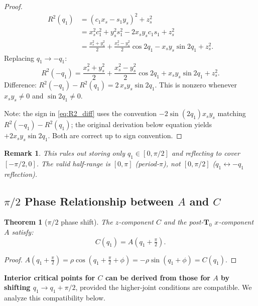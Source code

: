 \documentclass[11pt,a4paper]{article}
\newtheorem{theorem}{Theorem}[section]
\newtheorem{remark}{Remark}[section]
\newcommand{\bT}{\mathbf{T}}
\begin{document}
\begin{proof}
\begin{align*}
  R^2(q_1) &= (c_1 x_s - s_1 y_s)^2 + z_s^2 \\
  &= x_s^2 c_1^2 + y_s^2 s_1^2 - 2x_s y_s c_1 s_1 + z_s^2 \\
  &= \frac{x_s^2+y_s^2}{2} + \frac{x_s^2-y_s^2}{2}\cos 2q_1
    - x_s y_s \sin 2q_1 + z_s^2.
\end{align*}
Replacing $q_1 \to -q_1$:
\[
  R^2(-q_1) = \frac{x_s^2+y_s^2}{2}
    + \frac{x_s^2-y_s^2}{2}\cos 2q_1
    + x_s y_s \sin 2q_1 + z_s^2.
\]
Difference: $R^2(-q_1) - R^2(q_1) = 2\,x_s y_s \sin 2q_1$.
This is nonzero whenever $x_s y_s \ne 0$ and $\sin 2q_1 \ne 0$.

Note: the sign in \eqref{eq:R2_diff} uses the convention
$-2\sin(2q_1) x_s y_s$ matching $R^2(-q_1) - R^2(q_1)$; the original
derivation below equation yields $+2 x_s y_s \sin 2q_1$. Both are
correct up to sign convention.
\end{proof}

\begin{remark}
This rules out storing only $q_1 \in [0, \pi/2]$ and reflecting to
cover $[-\pi/2, 0]$. The valid half-range is $[0, \pi]$ (period-$\pi$),
not $[0, \pi/2]$ ($q_1 \leftrightarrow -q_1$ reflection).
\end{remark}


\subsection{$\pi/2$ Phase Relationship between $A$ and $C$}\label{sec:pi2_phase}

\begin{theorem}[$\pi/2$ phase shift]\label{thm:pi2}
The $z$-component $C$ and the post-$\bT_0$ $x$-component $A$ satisfy:
\begin{equation}\label{eq:C_A_pi2}
  \boxed{C(q_1) = A(q_1 + \tfrac\pi2).}
\end{equation}
\end{theorem}

\begin{proof}
$A(q_1+\tfrac\pi2) = \rho\cos(q_1 + \tfrac\pi2 + \phi)
= -\rho\sin(q_1+\phi) = C(q_1)$.
\end{proof}

\begin{tcolorbox}[colback=blue!5, colframe=blue!50!black, title=Key Implication]
\textbf{Interior critical points for $C$ can be derived from those for
$A$ by shifting $q_1 \to q_1 + \pi/2$}, provided the higher-joint
conditions are compatible. We analyze this compatibility below.
\end{tcolorbox}
\end{document}
